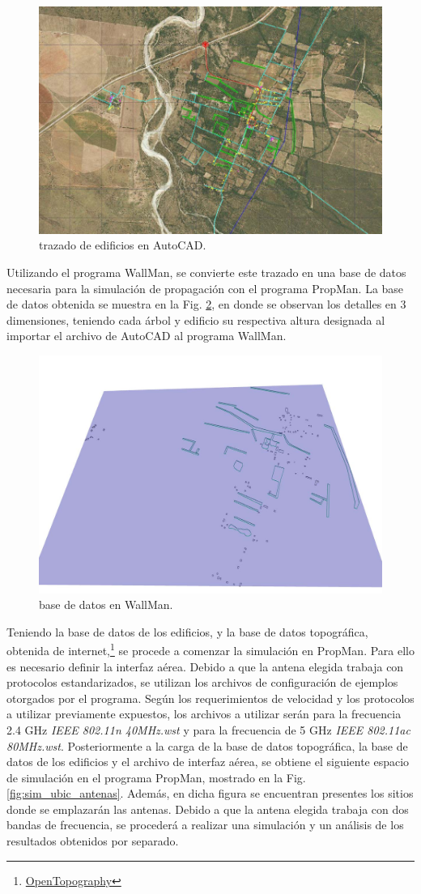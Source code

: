 \documentclass[11pt,a4paper]{article}
\begin{document}
\begin{figure}[htbp]
  \centering
  \includegraphics[width=0.6\linewidth]{fotos_ema/trazado_edif_autocad.jpg}
  \caption{trazado de edificios en AutoCAD.}
  \label{fig:trazado_edif_autocad}
\end{figure}

Utilizando el programa WallMan, se convierte este trazado en una base de datos necesaria para la simulación de propagación con el programa PropMan. 
La base de datos obtenida se muestra en la Fig. \ref{fig:base_datos_wallman}, en donde se observan los detalles en 3 dimensiones, teniendo cada árbol y edificio su respectiva altura designada al importar el archivo de AutoCAD al programa WallMan.


\begin{figure}[htbp]
  \centering
  \includegraphics[width=0.5\linewidth]{fotos_ema/base_datos_wallman.jpg}
  \caption{base de datos en WallMan.}
  \label{fig:base_datos_wallman}
\end{figure}

Teniendo la base de datos de los edificios, y la base de datos topográfica, obtenida de internet,\footnote{\href{https://opentopography.org}{OpenTopography}} se procede a comenzar la simulación en PropMan. 
Para ello es necesario definir la interfaz aérea. 
Debido a que la antena elegida trabaja con protocolos estandarizados, se utilizan los archivos de configuración de ejemplos otorgados por el programa. Según los requerimientos de velocidad y los protocolos a utilizar previamente expuestos, los archivos a utilizar serán para la frecuencia 2.4 GHz \textit{IEEE 802.11n 40MHz.wst }y para la frecuencia de 5 GHz \textit{IEEE 802.11ac 80MHz.wst}. 
Posteriormente a la carga de la base de datos topográfica, la base de datos de los edificios y el archivo de interfaz aérea, se obtiene el siguiente espacio de simulación en el programa PropMan, mostrado en la Fig. \ref{fig:sim_ubic_antenas}. 
Además, en dicha figura se encuentran presentes los sitios donde se emplazarán las antenas. 
Debido a que la antena elegida trabaja con dos bandas de frecuencia, se procederá a realizar una simulación y un análisis de los resultados obtenidos por separado.
\end{document}
